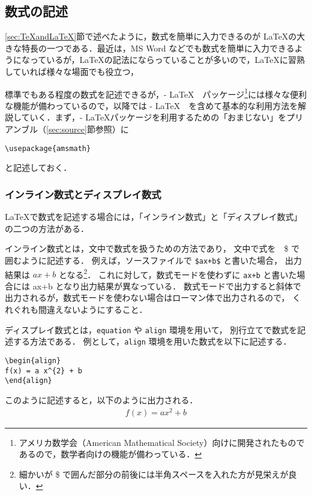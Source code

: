 \subsection{数式の記述}
\label{sec:math}

\ref{sec:TeXandLaTeX}節で述べたように，数式を簡単に入力できるのが \LaTeX の大きな特長の一つである．最近は，MS Word などでも数式を簡単に入力できるようになっているが，\LaTeX の記法にならっていることが多いので，\LaTeX に習熟していれば様々な場面でも役立つ，

標準でもある程度の数式を記述できるが，\AmS - \LaTeX　パッケージ\footnote{アメリカ数学会（American Mathematical Society）向けに開発されたものであるので，数学者向けの機能が備わっている．}には様々な便利な機能が備わっているので，以降では \AmS - \LaTeX　を含めて基本的な利用方法を解説していく．まず，\AmS - \LaTeX パッケージを利用するための「おまじない」をプリアンブル（\ref{sec:source}節参照）に
\begin{screen}
\begin{verbatim}
\usepackage{amsmath}
\end{verbatim}
\end{screen}
と記述しておく．

\subsubsection{インライン数式とディスプレイ数式}

\LaTeX で数式を記述する場合には，「インライン数式」と「ディスプレイ数式」の二つの方法がある．

インライン数式とは，文中で数式を扱うための方法であり，
文中で式を　\$ で囲むように記述する．
例えば，ソースファイルで \verb|$ax+b$| と書いた場合，
出力結果は $ax+b$ となる\footnote{細かいが  \$ で囲んだ部分の前後には半角スペースを入れた方が見栄えが良い． }．
これに対して，数式モードを使わずに \verb|ax+b| と書いた場合には ax+b となり出力結果が異なっている．
数式モードで出力すると斜体で出力されるが，数式モードを使わない場合はローマン体で出力されるので，
くれぐれも間違えないようにすること．

ディスプレイ数式とは，\verb|equation| や \verb|align| 環境を用いて，
別行立てで数式を記述する方法である．
例として，\verb|align| 環境を用いた数式を以下に記述する．

\begin{screen}
\begin{verbatim}
\begin{align}
f(x) = a x^{2} + b
\end{align}
\end{verbatim}
\end{screen}
このように記述すると，以下のように出力される．
%
\begin{align}
f(x) = a x^{2} + b
\end{align}

